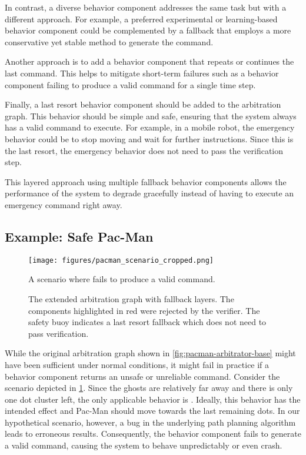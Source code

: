 In contrast, a diverse behavior component addresses the same task but with a different approach.
For example, a preferred experimental or learning-based behavior component could be complemented by a fallback that employs a more conservative yet stable method to generate the command.

Another approach is to add a behavior component that repeats or continues the last command.
This helps to mitigate short-term failures such as a behavior component failing to produce a valid command for a single time step.

Finally, a last resort behavior component should be added to the arbitration graph.
This behavior should be simple and safe, ensuring that the system always has a valid command to execute.
For example, in a mobile robot, the emergency behavior could be to stop moving and wait for further instructions.
Since this is the last resort, the emergency behavior does not need to pass the verification step.

This layered approach using multiple fallback behavior components allows the performance of the system to degrade gracefully instead of having to execute an emergency command right away.

\subsection{Example: Safe Pac-Man}

\begin{figure}
    \centering
    \texttt{[image: figures/pacman\_scenario\_cropped.png]}
    \caption{A scenario where  fails to produce a valid command.}
    \label{fig:pacman-scenario}
\end{figure}

\begin{figure}
    \centering
    
    \caption{The extended arbitration graph with fallback layers.
        The components highlighted in red were rejected by the verifier.
        The safety buoy indicates a last resort fallback which does not need to pass verification.}
    \label{fig:pacman-arbitrator-safe}
\end{figure}

While the original arbitration graph shown in \cref{fig:pacman-arbitrator-base} might have been sufficient under normal conditions, it might fail in practice if a behavior component returns an unsafe or unreliable command.
Consider the scenario depicted in \cref{fig:pacman-scenario}.
Since the ghosts are relatively far away and there is only one dot cluster left, the only applicable behavior is .
Ideally, this behavior has the intended effect and Pac-Man should move towards the last remaining dots.
In our hypothetical scenario, however, a bug in the underlying path planning algorithm leads to erroneous results.
Consequently, the behavior component fails to generate a valid command, causing the system to behave unpredictably or even crash.

